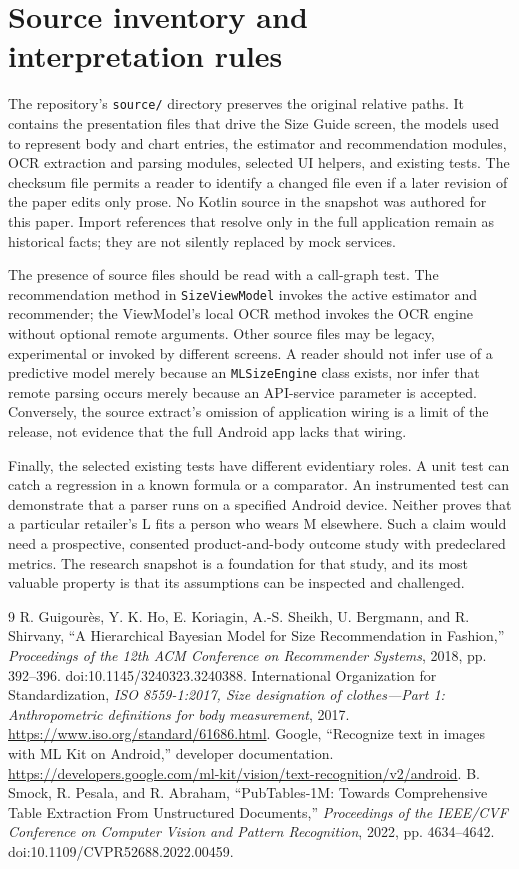 \documentclass[11pt,a4paper]{article}
\begin{document}
\section{Source inventory and interpretation rules}
The repository's \texttt{source/} directory preserves the original relative paths. It contains the presentation files that drive the Size Guide screen, the models used to represent body and chart entries, the estimator and recommendation modules, OCR extraction and parsing modules, selected UI helpers, and existing tests. The checksum file permits a reader to identify a changed file even if a later revision of the paper edits only prose. No Kotlin source in the snapshot was authored for this paper. Import references that resolve only in the full application remain as historical facts; they are not silently replaced by mock services.

The presence of source files should be read with a call-graph test. The recommendation method in \texttt{SizeViewModel} invokes the active estimator and recommender; the ViewModel's local OCR method invokes the OCR engine without optional remote arguments. Other source files may be legacy, experimental or invoked by different screens. A reader should not infer use of a predictive model merely because an \texttt{MLSizeEngine} class exists, nor infer that remote parsing occurs merely because an API-service parameter is accepted. Conversely, the source extract's omission of application wiring is a limit of the release, not evidence that the full Android app lacks that wiring.

Finally, the selected existing tests have different evidentiary roles. A unit test can catch a regression in a known formula or a comparator. An instrumented test can demonstrate that a parser runs on a specified Android device. Neither proves that a particular retailer's L fits a person who wears M elsewhere. Such a claim would need a prospective, consented product-and-body outcome study with predeclared metrics. The research snapshot is a foundation for that study, and its most valuable property is that its assumptions can be inspected and challenged.

\begin{thebibliography}{9}
 R. Guigour\`es, Y. K. Ho, E. Koriagin, A.-S. Sheikh, U. Bergmann, and R. Shirvany, ``A Hierarchical Bayesian Model for Size Recommendation in Fashion,'' \emph{Proceedings of the 12th ACM Conference on Recommender Systems}, 2018, pp. 392--396. doi:10.1145/3240323.3240388.
 International Organization for Standardization, \emph{ISO 8559-1:2017, Size designation of clothes---Part 1: Anthropometric definitions for body measurement}, 2017. \url{https://www.iso.org/standard/61686.html}.
 Google, ``Recognize text in images with ML Kit on Android,'' developer documentation. \url{https://developers.google.com/ml-kit/vision/text-recognition/v2/android}.
 B. Smock, R. Pesala, and R. Abraham, ``PubTables-1M: Towards Comprehensive Table Extraction From Unstructured Documents,'' \emph{Proceedings of the IEEE/CVF Conference on Computer Vision and Pattern Recognition}, 2022, pp. 4634--4642. doi:10.1109/CVPR52688.2022.00459.
\end{thebibliography}
\end{document}
